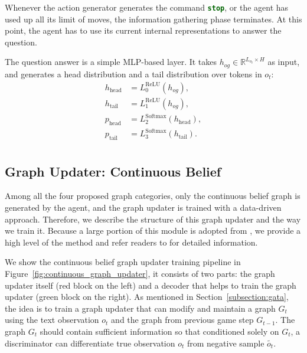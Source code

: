 \documentclass[11pt]{article}
\newcommand{\code}[1]{\texttt{#1}}
\newcommand{\cmd}[1]{\textcolor{darkgreen}{\textbf{\small{\code{#1}}}}}
\begin{document}
Whenever the action generator generates the command \cmd{stop}, or the agent has used up all its limit of moves, the information gathering phase terminates.
At this point, the agent has to use its current internal representations to answer the question.

The question answer is a simple MLP-based layer.
It takes $h_{og} \in \mathbb{R}^{L_{o_t} \times H}$ as input, and generates a head distribution and a tail distribution over tokens in $o_t$:
\begin{equation}
\begin{aligned}
    h_{\text{head}} &= L_0^\textrm{ReLU}(h_{og}), \\
    h_{\text{tail}} &= L_1^\textrm{ReLU}(h_{og}), \\
    p_{\text{head}} &= L_2^\textrm{Softmax}(h_{\text{head}}), \\
    p_{\text{tail}} &= L_3^\textrm{Softmax}(h_{\text{tail}}). \\
\end{aligned}
\end{equation}


\subsection{Graph Updater: Continuous Belief}
\label{appendix:gata_updater}

Among all the four proposed graph categories, only the continuous belief graph is generated by the agent, and the graph updater is trained with a data-driven approach.
Therefore, we describe the structure of this graph updater and the way we train it.
Because a large portion of this module is adopted from \citep{adhikari2020gata}, we provide a high level of the method and refer readers to \citep{adhikari2020gata} for detailed information.

We show the continuous belief graph updater training pipeline in Figure~\ref{fig:continuous_graph_updater}, it consists of two parts: the graph updater itself (red block on the left) and a decoder that helps to train the graph updater (green block on the right).
As mentioned in Section~\ref{subsection:gata}, the idea is to train a graph updater that can modify and maintain a graph $G_t$ using the text observation $o_t$ and the graph from previous game step $G_{t-1}$. 
The graph $G_t$ should contain sufficient information so that conditioned solely on $G_t$, a discriminator can differentiate true observation $o_t$ from negative sample $\tilde{o_t}$.
\end{document}
